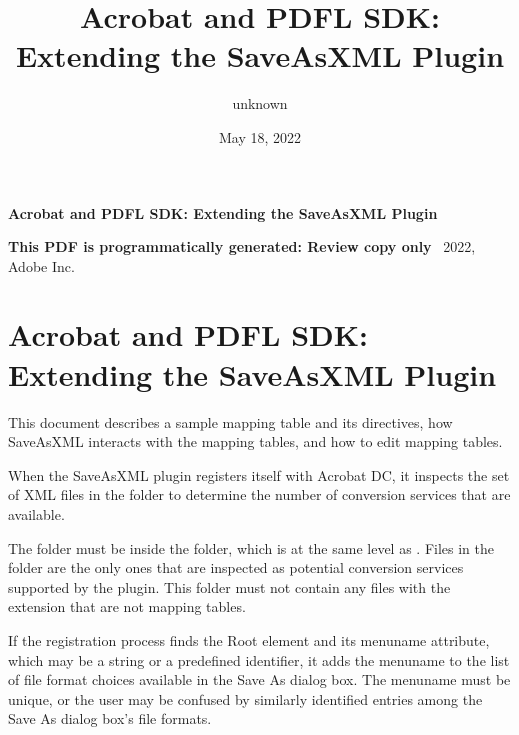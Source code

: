 \documentclass[letterpaper,12pt,english,openany,oneside]{sphinxmanual}
\title{Acrobat and PDFL SDK: Extending the SaveAsXML Plugin}
\date{May 18, 2022}
\author{unknown}
\begin{document}
\pagestyle{empty}

    \begin{titlepage}
        \begin{figure}[h]
        \end{figure}
        \centering
        \vspace*{40mm}
        \textbf{\Huge Acrobat and PDFL SDK: Extending the SaveAsXML Plugin}

        \vspace{15mm}
        \Large \textbf{{This PDF is programmatically generated: Review copy only}}
        \vfill
        \small \textcopyright\ 2022, Adobe Inc.
    \end{titlepage}
    \clearpage
    \tableofcontents
    \clearpage
    
\pagestyle{plain}

\pagestyle{normal}
\label{\detokenize{toc::doc}}



\chapter{Acrobat and PDFL SDK: Extending the SaveAsXML Plugin}
\label{\detokenize{index:acrobat-and-pdfl-sdk-extending-the-saveasxml-plugin}}\label{\detokenize{index::doc}}
This document describes a sample mapping table and its directives, how SaveAsXML interacts with the mapping tables, and how to edit mapping tables.

When the SaveAsXML plug\sphinxhyphen{}in registers itself with Acrobat DC, it inspects the set of XML files in the  folder to determine the number of conversion services that are available.

The  folder must be inside the  folder, which is at the same level as . Files in the  folder are the only ones that are inspected as potential conversion services supported by the plug\sphinxhyphen{}in. This folder must not contain any files with the  extension that are not mapping tables.

If the registration process finds the Root element and its menu\sphinxhyphen{}name attribute, which may be a string or a predefined identifier, it adds the menu\sphinxhyphen{}name to the list of file format choices available in the Save As dialog box. The menu\sphinxhyphen{}name must be unique, or the user may be confused by similarly identified entries among the Save As dialog box’s file formats.
\end{document}
